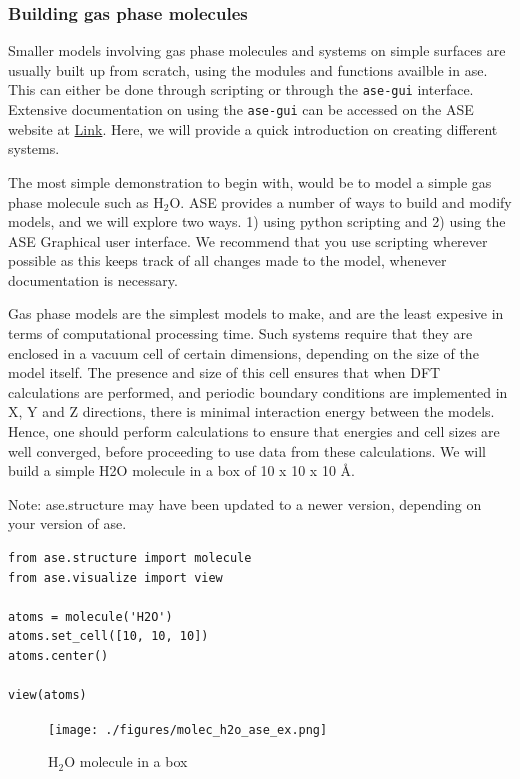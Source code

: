 \documentclass[11pt]{article}
\begin{document}
\subsubsection{Building gas phase molecules}
\label{sec-5-0-3}
Smaller models involving gas phase molecules and systems on simple surfaces are usually built up from scratch, using the modules and functions availble in ase. This can either be done through scripting or through the \texttt{ase-gui} interface. Extensive documentation on using the \texttt{ase-gui} can be accessed on the ASE website at \href{https://wiki.fysik.dtu.dk/ase/ase/gui/gui.html}{Link}. Here, we will provide a quick introduction on creating different systems.

The most simple demonstration to begin with, would be to model a simple gas phase molecule such as H$_{\text{2}}$O. ASE provides a number of ways to build and modify models, and we will explore two ways. 1) using python scripting and 2) using the ASE Graphical user interface. We recommend that you use scripting wherever possible as this keeps track of all changes made to the model, whenever documentation is necessary. 

Gas phase models are the simplest models to make, and are the least expesive in terms of computational processing time. Such systems require that they are enclosed in a vacuum cell of certain dimensions, depending on the size of the model itself. The presence and size of this cell ensures that when DFT calculations are performed, and periodic boundary conditions are implemented in X, Y and Z directions, there is minimal interaction energy between the models. Hence, one should perform calculations to ensure that energies and cell sizes are well converged, before proceeding to use data from these calculations.
We will build a simple H2O molecule in a box of 10 x 10 x 10 \AA{}. 

Note: ase.structure may have been updated to a newer version, depending on your version of ase.
\begin{verbatim}
from ase.structure import molecule
from ase.visualize import view

atoms = molecule('H2O')
atoms.set_cell([10, 10, 10])
atoms.center()

view(atoms)
\end{verbatim}

\begin{figure}[htb]
\centering
\texttt{[image: ./figures/molec\_h2o\_ase\_ex.png]}
\caption{H$_{\text{2}}$O molecule in a box}
\end{figure}
\end{document}
